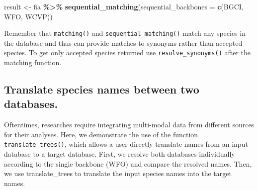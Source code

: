 \documentclass[
  11pt,
]{article}
\newenvironment{Shaded}{\begin{snugshade}}{\end{snugshade}}
\newcommand{\AttributeTok}[1]{\textcolor[rgb]{0.13,0.29,0.53}{#1}}
\newcommand{\FunctionTok}[1]{\textcolor[rgb]{0.13,0.29,0.53}{\textbf{#1}}}
\newcommand{\NormalTok}[1]{#1}
\newcommand{\OtherTok}[1]{\textcolor[rgb]{0.56,0.35,0.01}{#1}}
\newcommand{\SpecialCharTok}[1]{\textcolor[rgb]{0.81,0.36,0.00}{\textbf{#1}}}
\newcommand{\StringTok}[1]{\textcolor[rgb]{0.31,0.60,0.02}{#1}}
\begin{document}
\begin{Shaded}
\begin{Highlighting}[]
\NormalTok{result }\OtherTok{\textless{}{-}}\NormalTok{ fia }\SpecialCharTok{\%\textgreater{}\%} 
  \FunctionTok{sequential\_matching}\NormalTok{(}\AttributeTok{sequential\_backbones =} \FunctionTok{c}\NormalTok{(}\StringTok{\textquotesingle{}BGCI\textquotesingle{}}\NormalTok{, }\StringTok{\textquotesingle{}WFO\textquotesingle{}}\NormalTok{, }\StringTok{\textquotesingle{}WCVP\textquotesingle{}}\NormalTok{))}
\end{Highlighting}
\end{Shaded}

\noindent Remember that \verb|matching()| and
\verb|sequential_matching()| match any species in the database and thus
can provide matches to synonyms rather than accepted species. To get
only accepted species returned use \verb|resolve_synonyms()| after the
matching function.

\hypertarget{translate-species-names-between-two-databases.}{%
\subsection{Translate species names between two
databases.}\label{translate-species-names-between-two-databases.}}

Oftentimes, researches require integrating multi-modal data from
different sources for their analyses. Here, we demonstrate the use of
the function \verb|translate_trees()|, which allows a user directly
translate names from an input database to a target database. First, we
resolve both databases individually according to the single backbone
(WFO) and compare the resolved names. Then, we use translate\_trees to
translate the input species names into the target names.
\end{document}
